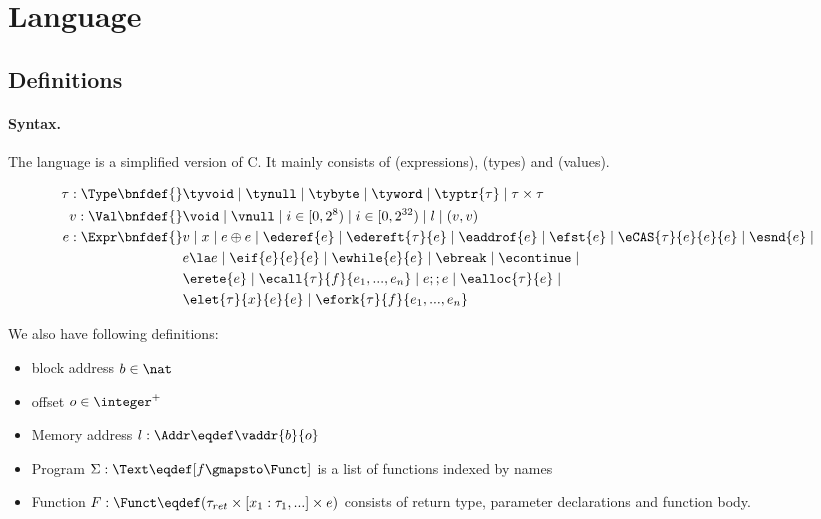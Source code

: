 \section{Language}
\label{sec:language}

\subsection{Definitions}

\paragraph{Syntax.}\label{p:type}

The language is a simplified version of C. It mainly consists of
\Expr{} (expressions), \Type{} (types) and \Val{} (values).

\begin{align*}
    \tau : \Type \bnfdef{}&
        \tyvoid \mid
        \tynull \mid
        \tybyte \mid
        \tyword \mid
        \typtr{\tau} \mid
        \tau \times \tau
\\
    v : \Val \bnfdef{}&
        \void \mid
        \vnull \mid
        i \in [0, 2^8) \mid
        i \in [0, 2^{32}) \mid
        l \mid
        (v, v)
\\
    e : \Expr \bnfdef{}&
       v \mid
       x \mid
       e \oplus e \mid
       \ederef{e} \mid
       \edereft{\tau}{e} \mid
       \eaddrof{e} \mid
       \efst{e} \mid
       \eCAS{\tau}{e}{e}{e} \mid
       \esnd{e} \mid
       \\&
       e \la e \mid
       \eif{e}{e}{e} \mid
       \ewhile{e}{e} \mid
       \ebreak \mid
       \econtinue \mid
       \\&
       \erete{e} \mid
       \ecall{\tau}{f}{e_1, ..., e_n} \mid
       e ;; e \mid
       \ealloc{\tau}{e} \mid
       \\&
       \elet{\tau}{x}{e}{e} \mid
       \efork{\tau}{f}{e_1, ..., e_n}
\\
\end{align*}

We also have following definitions:

\begin{itemize}
  \item block address $b \in \nat$
  \item offset $o \in \integer^{+}$
  \item Memory address $l: \Addr \eqdef \vaddr{b}{o}$
  \item Program $\Sigma: \Text \eqdef [f \gmapsto \Funct]$ is a list of functions indexed by names
  \item Function $F: \Funct \eqdef (\tau_{ret} \times [x_1 : \tau_1, ...] \times e)$ consists of return type,
    parameter declarations and function body.
\end{itemize}

